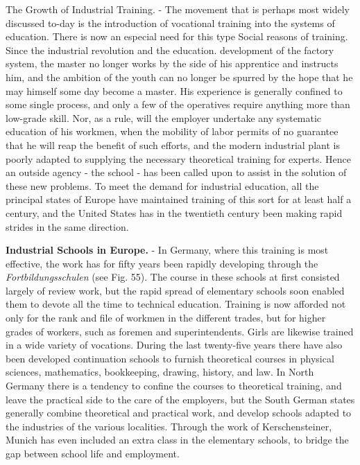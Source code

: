 \documentclass[]{book}
\begin{document}
The Growth of Industrial Training. - The movement that is perhaps most widely discussed to-day is the introduction of vocational training into the systems of education. There is now an especial need for this type Social reasons of training. Since the industrial revolution and the education. development of the factory system, the master no longer works by the side of his apprentice and instructs him, and the ambition of the youth can no longer be spurred by the hope that he may himself some day become a master. His experience is generally confined to some single process, and only a few of the operatives require anything more than low-grade skill. Nor, as a rule, will the employer undertake any systematic education of his workmen, when the mobility of labor permits of no guarantee that he will reap the benefit of such efforts, and the modern industrial plant is poorly adapted to supplying the necessary theoretical training for experts. Hence an outside agency - the school - has been called upon to assist in the solution of these new problems. To meet the demand for industrial education, all the principal states of Europe have maintained training of this sort for at least half a century, and the United States has in the twentieth century been making rapid strides in the same direction.

\textbf{Industrial Schools in Europe.} - In Germany, where this training is most effective, the work has for fifty years been rapidly developing through the \emph{Fortbildungsschulen} (see Fig. 55). The course in these schools at first consisted largely of review work, but the rapid spread of elementary schools soon enabled them to devote all the time to technical education. Training is now afforded not only for the rank and file of workmen in the different trades, but for higher grades of workers, such as foremen and superintendents. Girls are likewise trained in a wide variety of vocations. During the last twenty-five years there have also been developed continuation schools to furnish theoretical courses in physical sciences, mathematics, bookkeeping, drawing, history, and law. In North Germany there is a tendency to confine the courses to theoretical training, and leave the practical side to the care of the employers, but the South German states generally combine theoretical and practical work, and develop schools adapted to the industries of the various localities. Through the work of Kerschensteiner, Munich has even included an extra class in the elementary schools, to bridge the gap between school life and employment.
\end{document}
